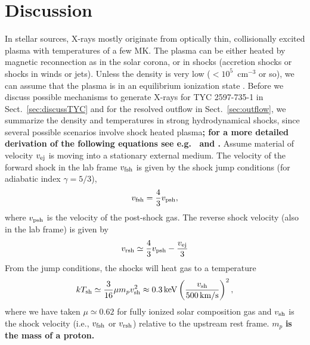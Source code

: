 \documentclass[linenumbers]{aastex631}
\newcommand{\be}{\begin{equation}}
\newcommand{\ee}{\end{equation}}
\begin{document}
\section{Discussion}  \label{sec:discussion}
In stellar sources, X-rays mostly originate from optically thin, collisionally excited plasma with temperatures of a few MK. The plasma can be either heated by magnetic reconnection as in the solar corona, or in shocks (accretion shocks or shocks in winds or jets). Unless the density is very low ($<10^5$~cm$^{-3}$ or so), we can assume that the plasma is in an equilibrium ionization state \citep{2007A&A...466.1111G}.
%
Before we discuss possible mechanisms to generate X-rays for TYC 2597-735-1 in Sect.~\ref{sec:discussTYC} and for the resolved outflow in Sect.~\ref{sec:outflow}, we summarize the density and temperatures in strong hydrodynamical shocks, since several possible scenarios involve shock heated plasma\textbf{; for a more detailed derivation of the following equations see e.g.\ \citet{2007A&A...466.1111G} and \citet{1967pswh.book.....Z}.}
Assume material of velocity $v_{\rm ej}$ is moving into a stationary external medium.  The velocity of the forward shock in the lab frame $v_{\rm fsh}$ is given by the shock jump conditions (for adiabatic index $\gamma = 5/3$),
\be
v_{\rm fsh} = \frac{4}{3}v_{\rm psh}, \label{eqn:vsh1}
\ee
where $v_{\rm psh}$ is the velocity of the post-shock gas.  The reverse shock velocity (also in the lab frame) is given by
\be
v_{\rm rsh} \simeq \frac{4}{3}v_{\rm psh} - \frac{v_{\rm ej}}{3}
\label{eqn:vsh2}
\ee
From the jump conditions, the shocks will heat gas to a temperature
\be
kT_{\rm sh} \simeq \frac{3}{16}\mu m_p v_{\rm sh}^{2} \approx 0.3\,{\rm keV}\left(\frac{v_{\rm sh}}{500\,{\rm km/s}}\right)^{2},
\label{eqn:Tshock}
\ee
where we have taken $\mu \simeq 0.62$ for fully ionized solar composition gas and $v_{\rm sh}$ is the shock velocity (i.e., $v_{\rm fsh}$ or $v_{\rm rsh}$) relative to the upstream rest frame. $m_p$ \textbf{is the mass of a proton.}
\end{document}
